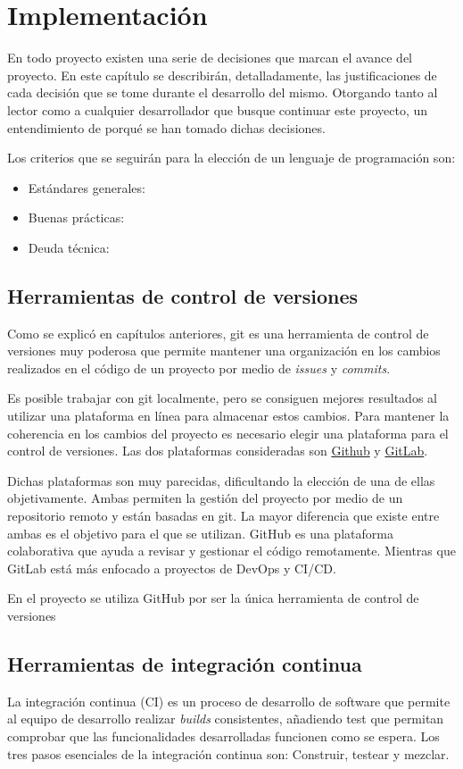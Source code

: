 \chapter{Implementación}
En todo proyecto existen una serie de decisiones que marcan el avance del proyecto. En este capítulo se describirán, detalladamente, las justificaciones de cada decisión que se tome durante el desarrollo del mismo. Otorgando tanto al lector como a cualquier desarrollador que busque continuar este proyecto, un entendimiento de porqué se han tomado dichas decisiones.

Los criterios que se seguirán para la elección de un lenguaje de programación son: 
\begin{itemize}
    \item Estándares generales: 
    \item Buenas prácticas:
    \item Deuda técnica: 
\end{itemize}

\section{Herramientas de control de versiones}
Como se explicó en capítulos anteriores, \Gls{git} es una herramienta de control de versiones muy poderosa que permite mantener una organización en los cambios realizados en el código de un proyecto por medio de \emph{issues} y \emph{commits}.

Es posible trabajar con \Gls{git} localmente, pero se consiguen mejores resultados al utilizar una plataforma en línea para almacenar estos cambios. Para mantener la coherencia en los cambios del proyecto es necesario elegir una plataforma para el control de versiones. Las dos plataformas consideradas son \href{}{Github} y \href{}{GitLab}. 

Dichas plataformas son muy parecidas, dificultando la elección de una de ellas objetivamente. Ambas permiten la gestión del proyecto por medio de un repositorio remoto y están basadas en \Gls{git}. La mayor diferencia que existe entre ambas es el objetivo para el que se utilizan. GitHub es una plataforma colaborativa que ayuda a revisar y gestionar el código remotamente. Mientras que GitLab está más enfocado a proyectos de DevOps y CI/CD. \cite{VCS2022}

En el proyecto se utiliza GitHub por ser la única herramienta de control de versiones  

\section{Herramientas de integración continua}
La integración continua (CI) es un proceso de desarrollo de software que permite al equipo de desarrollo realizar \emph{builds} consistentes, añadiendo test que permitan comprobar que las funcionalidades desarrolladas funcionen como se espera. Los tres pasos esenciales de la integración continua son: Construir, testear y mezclar. \cite{virtanen2021comparing}

